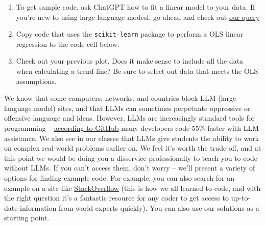 \documentclass[
  letterpaper,
  DIV=11,
  numbers=noendperiod,
  oneside]{scrreprt}
\providecommand{\tightlist}{%
  \setlength{\itemsep}{0pt}\setlength{\parskip}{0pt}}
\begin{document}
\begin{tcolorbox}[enhanced jigsaw, colbacktitle=quarto-callout-color!10!white, opacityback=0, bottomtitle=1mm, toptitle=1mm, bottomrule=.15mm, left=2mm, colframe=quarto-callout-color-frame, leftrule=.75mm, opacitybacktitle=0.6, colback=white, rightrule=.15mm, toprule=.15mm, breakable, titlerule=0mm, title=\textcolor{quarto-callout-color}{\faInfo}\hspace{0.5em}{Try It: Regression}, coltitle=black, arc=.35mm]

\begin{enumerate}
\def\labelenumi{\arabic{enumi}.}
\tightlist
\item
  To get sample code, ask ChatGPT how to fit a linear model to your
  data. If you're new to using large language modesl, go ahead and check
  out
  \href{https://chatgpt.com/share/649b897b-9075-457e-8e12-308f795312a1}{our
  query}
\item
  Copy code that uses the \texttt{scikit-learn} package to perform a OLS
  linear regression to the code cell below.
\item
  Check out your previous plot. Does it make sense to include all the
  data when calculating a trend line? Be sure to select out data that
  meets the OLS assumptions.
\end{enumerate}

\end{tcolorbox}

\begin{tcolorbox}[enhanced jigsaw, colbacktitle=quarto-callout-note-color!10!white, opacityback=0, bottomtitle=1mm, toptitle=1mm, bottomrule=.15mm, left=2mm, colframe=quarto-callout-note-color-frame, leftrule=.75mm, opacitybacktitle=0.6, colback=white, rightrule=.15mm, toprule=.15mm, breakable, titlerule=0mm, title=\textcolor{quarto-callout-note-color}{\faInfo}\hspace{0.5em}{Note}, coltitle=black, arc=.35mm]

We know that some computers, networks, and countries block LLM (large
language model) sites, and that LLMs can sometimes perpetuate oppressive
or offensive language and ideas. However, LLMs are increasingly standard
tools for programming --
\href{https://github.com/features/copilot}{according to GitHub} many
developers code 55\% faster with LLM assistance. We also see in our
classes that LLMs give students the ability to work on complex
real-world problems earlier on. We feel it's worth the trade-off, and at
this point we would be doing you a disservice professionally to teach
you to code without LLMs. If you can't access them, don't worry -- we'll
present a variety of options for finding example code. For example, you
can also search for an example on a site like
\href{https://stackoverflow.com/}{StackOverflow} (this is how we all
learned to code, and with the right question it's a fantastic resource
for any coder to get access to up-to-date information from world experts
quickly). You can also use our solutions as a starting point.

\end{tcolorbox}
\end{document}
